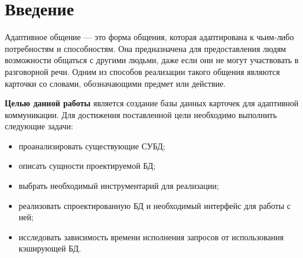 \chapter*{Введение}

Адаптивное общение --- это форма общения, которая адаптирована к чьим-либо потребностям и способностям. Она предназначена для предоставления людям возможности общаться с другими людьми, даже если они не могут участвовать в разговорной речи. Одним из способов реализации такого общения являются карточки со словами, обозначающими предмет или действие.

\textbf{Целью данной работы} является создание базы данных карточек для адаптивной коммуникации.
Для достижения поставленной цели необходимо выполнить следующие задачи:
\begin{itemize}
	\item проанализировать существующие СУБД;
    \item описать сущности проектируемой БД;
    \item выбрать необходимый инструментарий для реализации;
    \item реализовать спроектированную БД и необходимый интерфейс для работы с ней;
    \item исследовать зависимость времени исполнения запросов от использования кэширующей БД.
\end{itemize}
